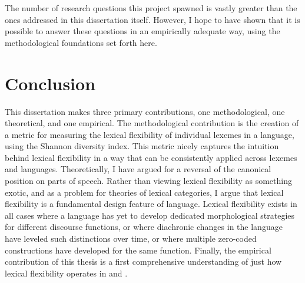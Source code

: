 The number of research questions this project spawned is vastly greater than the ones addressed in this dissertation itself. However, I hope to have shown that it is possible to answer these questions in an empirically adequate way, using the methodological foundations set forth here.

\section{Conclusion}
\label{sec:5.5}

This dissertation makes three primary contributions, one methodological, one theoretical, and one empirical. The methodological contribution is the creation of a metric for measuring the lexical flexibility of individual lexemes in a language, using the Shannon diversity index. This metric nicely captures the intuition behind lexical flexibility in a way that can be consistently applied across lexemes and languages. Theoretically, I have argued for a reversal of the canonical position on parts of speech. Rather than viewing lexical flexibility as something exotic, and as a problem for theories of lexical categories, I argue that lexical flexibility is a fundamental design feature of language. Lexical flexibility exists in all cases where a language has yet to develop dedicated morphological strategies for different discourse functions, or where diachronic changes in the language have leveled such distinctions over time, or where multiple zero-coded constructions have developed for the same function. Finally, the empirical contribution of this thesis is a first comprehensive understanding of just how lexical flexibility operates in  and .
